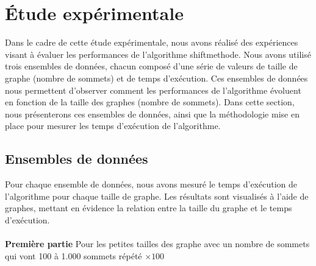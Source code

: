 \documentclass[hidelinks,letterpaper,12pt]{article}
\begin{document}
\newpage	

\section{Étude expérimentale}
Dans le cadre de cette étude expérimentale, nous avons réalisé des expériences visant à évaluer les performances de l'algorithme shiftmethode. Nous avons utilisé trois ensembles de données, chacun composé d'une série de valeurs de taille de graphe (nombre de sommets) et de temps d'exécution. Ces ensembles de données nous permettent d'observer comment les performances de l'algorithme évoluent en fonction de la taille des graphes (nombre de sommets). Dans cette section, nous présenterons ces ensembles de données, ainsi que la méthodologie mise en place pour mesurer les temps d'exécution de l'algorithme.

\subsection{Ensembles de données}
Pour chaque ensemble de données, nous avons mesuré le temps d'exécution de l'algorithme pour chaque taille de graphe. Les résultats sont visualisés à l'aide de graphes, mettant en évidence la relation entre la taille du graphe et le temps d'exécution. 
\\ \\
\textbf{Première partie}
Pour les petites tailles des graphe avec un nombre de sommets qui vont 100 à 1.000 sommets répété $\times100$
\\ \\
\end{document}
